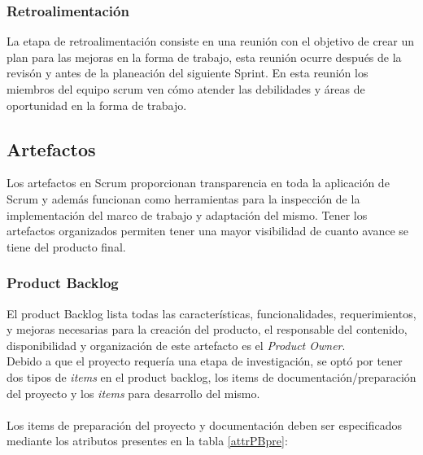 \subsubsection{Retroalimentación}

 La etapa de retroalimentación consiste en una reunión con el objetivo de crear un plan para las mejoras en
 la forma de trabajo, esta reunión ocurre después de la revisón y antes de la planeación del siguiente Sprint.
 En esta reunión los miembros del equipo scrum ven cómo atender las debilidades y áreas de oportunidad en la
 forma de trabajo.

\subsection{Artefactos}

 Los artefactos en Scrum proporcionan transparencia en toda la aplicación de Scrum
 y además funcionan como herramientas para la inspección de la implementación del
 marco de trabajo y adaptación del mismo. Tener los artefactos organizados permiten
 tener una mayor visibilidad de cuanto avance se tiene del producto final.
 
\clearpage

\subsubsection{Product Backlog}

 El product Backlog lista todas las características, funcionalidades, requerimientos, y mejoras
 necesarias para la creación del producto, el responsable del contenido, disponibilidad y organización
 de este artefacto es el {\it Product Owner}.\\
       
 \noindent Debido a que el proyecto requería una etapa de investigación, se optó por tener dos tipos
 de {\it items} en el product backlog, los items de documentación/preparación del proyecto  y los {\it items}
 para desarrollo del mismo.\\
    
    \\
    Los items de preparación del proyecto y documentación deben ser especificados
    mediante los atributos presentes en la tabla \ref{attrPBpre}:
    
